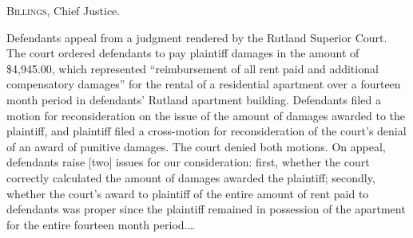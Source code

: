 
\opinion \textsc{Billings}, Chief Justice.

Defendants appeal from a judgment rendered by the Rutland Superior Court.  The
court ordered defendants to pay plaintiff damages in the amount of \$4,945.00,
which represented ``reimbursement of all rent paid and additional compensatory
damages'' for the rental of a residential apartment over a fourteen month
period in defendants' Rutland apartment building. Defendants filed a motion for
reconsideration on the issue of the amount of damages awarded to the plaintiff,
and plaintiff filed a cross-motion for reconsideration of the court's denial of
an award of punitive damages. The court denied both motions. On appeal,
defendants raise [two] issues for our consideration: first, whether the court
correctly calculated the amount of damages awarded the plaintiff; secondly,
whether the court's award to plaintiff of the entire amount of rent paid to
defendants was proper since the plaintiff remained in possession of the
apartment for the entire fourteen month period.\ldots

